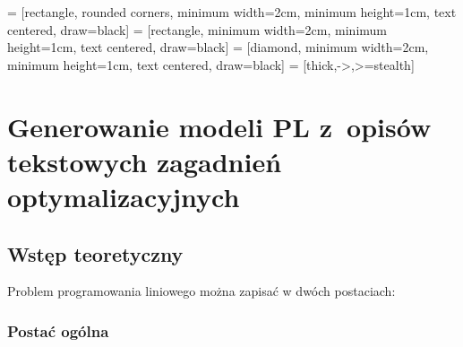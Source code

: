 \usetikzlibrary{shapes, arrows}
\usetikzlibrary{positioning}
\usetikzlibrary{shapes.geometric, arrows, positioning}
\usetikzlibrary{intersections, patterns, calc}

 = [rectangle, rounded corners, minimum width=2cm, minimum height=1cm, text centered, draw=black]
 = [rectangle, minimum width=2cm, minimum height=1cm, text centered, draw=black]
 = [diamond, minimum width=2cm, minimum height=1cm, text centered, draw=black]
 = [thick,->,>=stealth]

\chapter{Generowanie modeli PL z~opisów tekstowych zagadnień optymalizacyjnych}\label{ch:generation}

\section{Wstęp teoretyczny}


Problem programowania liniowego można zapisać w dwóch postaciach:

\subsection{Postać ogólna}
    

